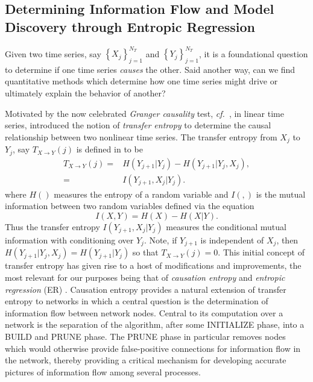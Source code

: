 \documentclass[a4paper,11pt]{article}
\newcommand{\cf}{{\it cf.}~}
\begin{document}
\subsection{Determining Information Flow and Model Discovery through Entropic Regression}

Given two time series, say $\left\{X_{j}\right\}_{j=1}^{N_{T}}$ and $\left\{Y_{j}\right\}_{j=1}^{N_{T}}$, it is a foundational question to determine if one time series {\it causes} the other.  Said another way, can we find quantitative methods which determine how one time series might drive or ultimately explain the behavior of another?  

Motivated by the now celebrated {\it Granger causality} test, \cf \cite{granger}, in linear time series, \cite{schreiber} introduced the notion of {\it transfer entropy} to determine the causal relationship between two nonlinear time series.  The transfer entropy from $X_{j}$ to $Y_{j}$, say $T_{X\rightarrow Y}(j)$ is defined in \cite{schreiber} to be 
\begin{align}
T_{X\rightarrow Y}(j) = & H\left(Y_{j+1}|Y_{j}\right) - H\left(Y_{j+1}|Y_{j}, X_{j}\right),  \\
= & I\left(Y_{j+1}, X_{j}|Y_{j} \right).
\end{align}
where $H()$ measures the entropy of a random variable and $I(,)$ is the mutual information between two random variables defined via the equation
\begin{equation}
I(X,Y) = H(X) - H(X|Y).  
\end{equation}
Thus the transfer entropy $I(Y_{j+1},X_{j}|Y_{j})$ measures the conditional mutual information with conditioning over $Y_{j}$.  Note, if $Y_{j+1}$ is independent of $X_{j}$, then $H(Y_{j+1}|Y_{j},X_{j}) = H(Y_{j+1}|Y_{j})$ so that $T_{X\rightarrow Y}(j) = 0$.  This initial concept of transfer entropy has given rise to a host of modifications and improvements, the most relevant for our purposes being that of {\it causation entropy} \cite{bollt} and {\it entropic regression} (ER) \cite{bollt2}.  Causation entropy provides a natural extension of transfer entropy to networks in which a central question is the determination of information flow between network nodes.  Central to its computation over a network is the separation of the algorithm, after some INITIALIZE phase, into a BUILD and PRUNE phase.  The PRUNE phase in particular removes nodes which would otherwise provide false-positive connections for information flow in the network, thereby providing a critical mechanism for developing accurate pictures of information flow among several processes.  
\end{document}

